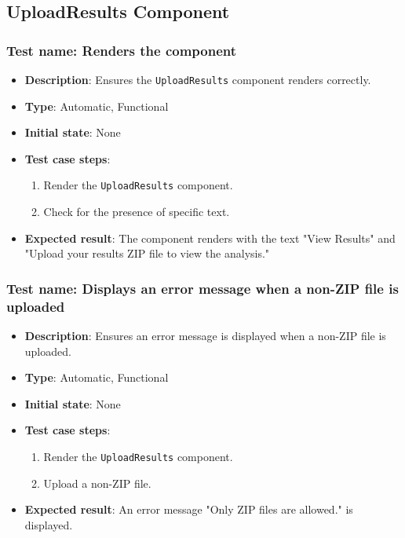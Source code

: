 \documentclass[12pt, titlepage]{article}
\begin{document}
\subsection{UploadResults Component}

\subsubsection{Test name: Renders the component}
\begin{itemize}
    \item \textbf{Description}: Ensures the \texttt{UploadResults} component renders correctly.
    \item \textbf{Type}: Automatic, Functional
    \item \textbf{Initial state}: None
    \item \textbf{Test case steps}:
    \begin{enumerate}
        \item Render the \texttt{UploadResults} component.
        \item Check for the presence of specific text.
    \end{enumerate}
    \item \textbf{Expected result}: The component renders with the text "View Results" and "Upload your results ZIP file to view the analysis."
\end{itemize}

\subsubsection{Test name: Displays an error message when a non-ZIP file is uploaded}
\begin{itemize}
    \item \textbf{Description}: Ensures an error message is displayed when a non-ZIP file is uploaded.
    \item \textbf{Type}: Automatic, Functional
    \item \textbf{Initial state}: None
    \item \textbf{Test case steps}:
    \begin{enumerate}
        \item Render the \texttt{UploadResults} component.
        \item Upload a non-ZIP file.
    \end{enumerate}
    \item \textbf{Expected result}: An error message "Only ZIP files are allowed." is displayed.
\end{itemize}
\end{document}
